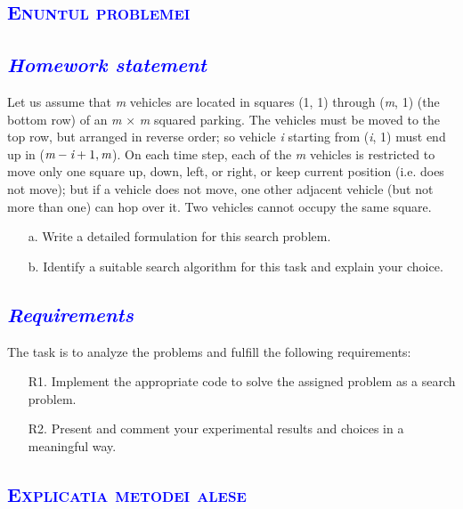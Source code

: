 \documentclass{article}
\begin{document}
\tableofcontents
\newpage
	\begin{center}
	  \textcolor{blue}{\section{\bfseries\scshape\textcolor{blue}{Enuntul problemei}}}
	   \vspace{20mm}
	\end{center}
 \textcolor{blue}{\subsection{\itshape  \textcolor{blue}{Homework statement }}}
 \quad Let us assume that \emph m vehicles are located in squares (1, 1) through (\emph m, 1) (the bottom row) of an \emph m × \emph m squared parking. The vehicles must be moved to the top row, but arranged in reverse order; so vehicle \emph i starting from (\emph i, 1) must end up in (\(\emph m - \emph i + 1, \emph m \)). On each time step, each of the \emph m vehicles is restricted to
 move only one square up, down, left, or right, or keep current position (i.e. does
 not move); but if a vehicle does not move, one other adjacent vehicle (but not
 more than one) can hop over it. Two vehicles cannot occupy the same square.\par
 \vspace{2mm}
\begin{itemize}
    \item[a.]Write a detailed formulation for this search problem.
    \item[b.]Identify a suitable search algorithm for this task and explain your choice.
\end{itemize}
\vspace{5mm}
 \textcolor{blue}{\subsection{\itshape \textcolor{blue}{Requirements }}}
The task is to analyze the problems and fulfill the following requirements:
\begin{itemize}
   \item[R1.]Implement the appropriate code to solve the assigned problem as a search problem.
   \item[R2.]Present and comment your experimental results and choices in a meaningful way.
\end{itemize}
\newpage
    \begin{center}
	    \textcolor{blue}{\section{\bfseries\scshape\textcolor{blue} {Explicatia metodei alese}}}
	   \vspace{15mm}
	\end{center}
\end{document}
